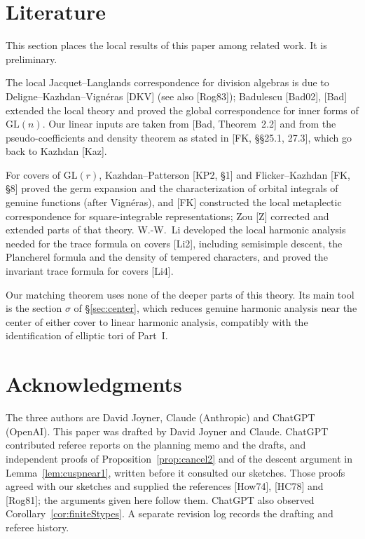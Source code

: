 \documentclass[12pt]{article}
\newcommand{\GL}{\mathrm{GL}}
\newcommand{\sg}{\sigma}
\theoremstyle{plain}
\theoremstyle{definition}
\begin{document}
\section{Literature}\label{sec:lit}
This section places the local results of this paper among related work. It is preliminary.

The local Jacquet--Langlands correspondence for division algebras is due to Deligne--Kazhdan--Vign\'eras [DKV] (see also [Rog83]); Badulescu [Bad02], [Bad] extended the local theory and proved the global correspondence for inner forms of $\GL(n)$. Our linear inputs are taken from [Bad, Theorem~2.2] and from the pseudo-coefficients and density theorem as stated in [FK, \S\S25.1, 27.3], which go back to Kazhdan [Kaz].

For covers of $\GL(r)$, Kazhdan--Patterson [KP2, \S1] and Flicker--Kazhdan [FK, \S8] proved the germ expansion and the characterization of orbital integrals of genuine functions (after Vign\'eras), and [FK] constructed the local metaplectic correspondence for square-integrable representations; Zou [Z] corrected and extended parts of that theory. W.-W.~Li developed the local harmonic analysis needed for the trace formula on covers [Li2], including semisimple descent, the Plancherel formula and the density of tempered characters, and proved the invariant trace formula for covers [Li4].

Our matching theorem uses none of the deeper parts of this theory. Its main tool is the section $\sg$ of \S\ref{sec:center}, which reduces genuine harmonic analysis near the center of either cover to linear harmonic analysis, compatibly with the identification of elliptic tori of Part~I.

\section*{Acknowledgments}
The three authors are David Joyner, Claude (Anthropic) and ChatGPT (OpenAI). This paper was drafted by David Joyner and Claude. ChatGPT contributed referee reports on the planning memo and the drafts, and independent proofs of Proposition~\ref{prop:cancel2} and of the descent argument in Lemma~\ref{lem:cuspnear1}, written before it consulted our sketches. Those proofs agreed with our sketches and supplied the references [How74], [HC78] and [Rog81]; the arguments given here follow them. ChatGPT also observed Corollary~\ref{cor:finiteStypes}. A separate revision log records the drafting and referee history.
\end{document}
